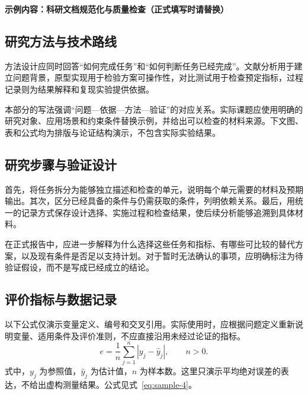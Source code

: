 \noindent\textbf{示例内容：科研文档规范化与质量检查（正式填写时请替换）}\par

\subsection{研究方法与技术路线}
方法设计应同时回答“如何完成任务”和“如何判断任务已经完成”。文献分析用于建立问题背景，原型实现用于检验方案可操作性，对比测试用于检查预定指标，过程记录则为结果解释和复现实验提供依据。

本部分的写法强调“问题—依据—方法—验证”的对应关系。实际课题应使用明确的研究对象、应用场景和约束条件替换示例，并给出可以检查的材料来源。下文图、表和公式均为排版与论证结构演示，不包含实际实验结果。

\subsection{研究步骤与验证设计}
首先，将任务拆分为能够独立描述和检查的单元，说明每个单元需要的材料及预期输出。其次，区分已经具备的条件与仍需获取的条件，列明依赖关系。最后，用统一的记录方式保存设计选择、实施过程和检查结果，使后续分析能够追溯到具体材料。

在正式报告中，应进一步解释为什么选择这些任务和指标、有哪些可比较的替代方案，以及现有条件是否足以支持计划。对于暂时无法确认的事项，应明确标注为待验证假设，而不是写成已经成立的结论。

\subsection{评价指标与数据记录}
以下公式仅演示变量定义、编号和交叉引用。实际使用时，应根据问题定义重新说明变量、适用条件及评价准则，不应直接沿用未经过论证的指标。
\begin{equation}\label{eq:sample-4}
e=\frac{1}{n}\sum_{j=1}^{n}|y_j-\hat y_j|,\qquad n>0.
\end{equation}
式中，$y_j$ 为参照值，$\hat y_j$ 为估计值，$n$ 为样本数。这里只演示平均绝对误差的表达，不给出虚构测量结果。公式见式~\eqref{eq:sample-4}。

